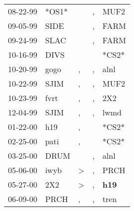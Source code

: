 \begin{supertabular}{p{0.07\textwidth}p{0.06\textwidth}p{0.02\textwidth}p{0.02\textwidth}p{0.06\textwidth}}
          08-22-99\textsuperscript{} &                            *OS1* &                  &                , &           MUF2\textsuperscript{} \\
          09-05-99\textsuperscript{} &           SIDE\textsuperscript{} &                  &                , &           FARM\textsuperscript{} \\
          09-24-99\textsuperscript{} &           SLAC\textsuperscript{} &                  &                , &           FARM\textsuperscript{} \\
          10-16-99\textsuperscript{} &           DIVS\textsuperscript{} &                  &                  &                            *CS2* \\
          10-20-99\textsuperscript{} &           gogo\textsuperscript{} &                , &                , &           alnl\textsuperscript{} \\
          10-22-99\textsuperscript{} &           SJIM\textsuperscript{} &                , &                , &           MUF2\textsuperscript{} \\
          10-23-99\textsuperscript{} &           fvrt\textsuperscript{} &                , &                , &            2X2\textsuperscript{} \\
          12-04-99\textsuperscript{} &           SJIM\textsuperscript{} &                , &                , &           lwmd\textsuperscript{} \\
          01-22-00\textsuperscript{} &            h19\textsuperscript{} &                , &                  &                            *CS2* \\
          02-25-00\textsuperscript{} &           pati\textsuperscript{} &                , &                  &                            *CS2* \\
          03-25-00\textsuperscript{} &           DRUM\textsuperscript{} &                  &                , &           alnl\textsuperscript{} \\
          05-06-00\textsuperscript{} &           iwyb\textsuperscript{} &     \textgreater &                , &           PRCH\textsuperscript{} \\
          05-27-00\textsuperscript{} &            2X2\textsuperscript{} &     \textgreater &                , &   \textbf{h19\textsuperscript{}} \\
          06-09-00\textsuperscript{} &           PRCH\textsuperscript{} &                , &                , &           tren\textsuperscript{} \\

\end{supertabular}
